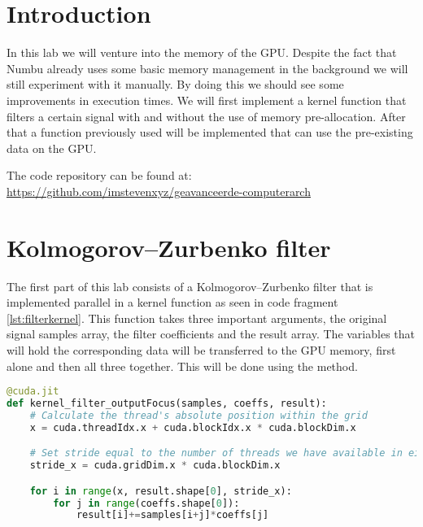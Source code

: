 
\section{Introduction}
\label{sec:introduction}
 
In this lab we will venture into the memory of the GPU. Despite the fact that Numbu already uses some basic memory management in the background we will still experiment with it manually. By doing this we should see some improvements in execution times. We will first implement a kernel function that filters a certain signal with and without the use of memory pre-allocation. After that a function previously used will be implemented that can use the pre-existing data on the GPU.

The code repository can be found at: \\
\url{https://github.com/imstevenxyz/geavanceerde-computerarch}

\newpage

\section{Kolmogorov–Zurbenko filter}
\label{sec:Kolmogorov–Zurbenko filter}

The first part of this lab consists of a Kolmogorov–Zurbenko filter that is implemented parallel in a kernel function as seen in code fragment \ref{lst:filterkernel}. This function takes three important arguments, the original signal samples array, the filter coefficients and the result array. The variables that will hold the corresponding data will be transferred to the GPU memory, first alone and then all three together. This will be done using the  method.

\begin{lstlisting}[language=Python,caption={KZ-filter kernel function},label={lst:filterkernel}]
@cuda.jit
def kernel_filter_outputFocus(samples, coeffs, result):
    # Calculate the thread's absolute position within the grid
    x = cuda.threadIdx.x + cuda.blockIdx.x * cuda.blockDim.x

    # Set stride equal to the number of threads we have available in either direction
    stride_x = cuda.gridDim.x * cuda.blockDim.x

    for i in range(x, result.shape[0], stride_x):
        for j in range(coeffs.shape[0]):
            result[i]+=samples[i+j]*coeffs[j]
\end{lstlisting}

